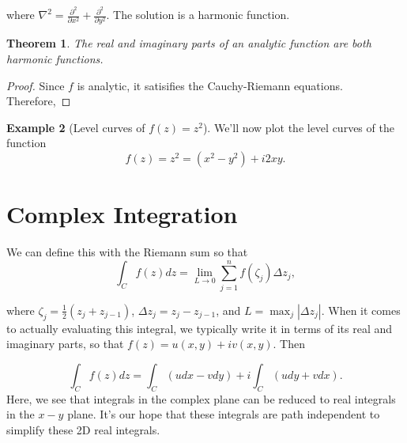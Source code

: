 \documentclass[12pt]{article}
\newcommand{\abs}[1]{ \left| #1 \right| }
\newtheorem{thm}{Theorem}[section]
\theoremstyle{definition}
\newtheorem{exmp}[thm]{Example}
\theoremstyle{remark}
\numberwithin{equation}{section}
\begin{document}
where $\nabla^2 = \frac{\partial^2}{\partial x^2} + \frac{\partial^2}{\partial y^2}$. The solution is a harmonic function.

\begin{thm}
  The real and imaginary parts of an analytic function are both harmonic functions.
\end{thm}

\begin{proof}
  Since $f$ is analytic, it satisifies the Cauchy-Riemann equations. Therefore,

\end{proof}


\begin{exmp}[Level curves of $f(z)=z^2$]
We'll now plot the level curves of the function
  \begin{equation}
    f(z) = z^2 = (x^2 - y^2) + i 2xy.
  \end{equation}

\end{exmp}


\section{Complex Integration}%
\label{sec:complex_integration}


We can define this with the Riemann sum so that
\begin{equation}
  \int_C f(z)dz = \lim\limits_{L \to 0} \sum_{j=1}^{n} f(\zeta_j)\Delta z_j,
\end{equation}

where $\zeta_j = \frac{1}{2}(z_j + z_{j-1})$, $\Delta z_j = z_{j} - z_{j-1}$, and $L = \max_{j}\abs{\Delta z_j}$. When it comes to actually evaluating this integral, we typically write it in terms of its real and imaginary parts, so that $f(z) = u(x,y) + iv(x,y)$. Then

\begin{equation}
  \int_C f(z)dz = \int_C (u dx -v dy) + i\int_C (u dy + vdx).
\end{equation}
Here, we see that integrals in the complex plane can be reduced to real integrals in the $x-y$ plane. It's our hope that these integrals are path independent to simplify these 2D real integrals.
\end{document}
